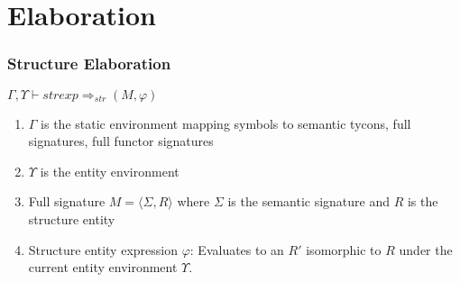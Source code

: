 \documentclass{beamer}
\begin{document}
	

	\section{Elaboration}
	
	\begin{frame}
		\frametitle{Structure Elaboration}
		$\Gamma,\Upsilon\vdash strexp \Rightarrow_{str} (M, \varphi)$
		
		\begin{enumerate}[<+->]
			\item $\Gamma$ is the static environment mapping symbols to semantic tycons, full signatures, full functor signatures 
			\item $\Upsilon$ is the entity environment
			\item Full signature $M=\langle \Sigma, R\rangle$ where $\Sigma$ is the semantic signature and $R$ is the structure entity
			\item Structure entity expression $\varphi$: Evaluates to an $R'$ isomorphic to $R$ under the current entity environment $\Upsilon$. 
		\end{enumerate}
	\end{frame}
	
\end{document}
